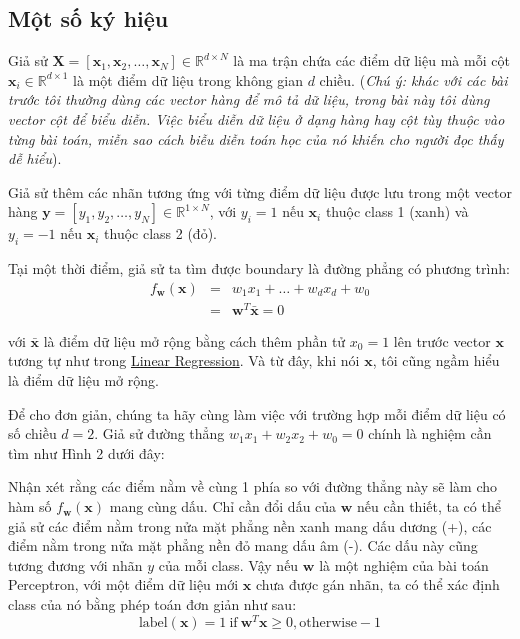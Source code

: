  
\subsection{Một số ký hiệu}
Giả sử $\mathbf{X} = [\mathbf{x}_1, \mathbf{x}_2, \dots, \mathbf{x}_N] \in \mathbb{R}^{d \times N}$ là ma trận chứa các điểm dữ liệu mà mỗi cột $\mathbf{x}_i \in \mathbb{R}^{d\times 1}$ là một điểm dữ liệu trong không gian $d$ chiều. (\textit{Chú ý: khác với các bài trước tôi thường dùng các vector hàng để mô tả dữ liệu, trong bài này tôi dùng vector cột để biểu diễn. Việc biểu diễn dữ liệu ở dạng hàng hay cột tùy thuộc vào từng bài toán, miễn sao cách biễu diễn toán học của nó khiến cho người đọc thấy dễ hiểu}). 
 
Giả sử thêm các nhãn tương ứng với từng điểm dữ liệu được lưu trong một vector hàng $\mathbf{y} = [y_1, y_2, \dots, y_N] \in \mathbb{R}^{1\times N}$, với $y_i = 1$ nếu $\mathbf{x}_i$ thuộc class 1 (xanh) và $y_i = -1$ nếu $\mathbf{x}_i$ thuộc class 2 (đỏ). 
 
Tại một thời điểm, giả sử ta tìm được boundary là đường phẳng có phương trình: 
\begin{eqnarray} 
f_{\mathbf{w}}(\mathbf{x}) &=& w_1x_1 + \dots + w_dx_d + w_0 \\\  
&=&\mathbf{w}^T\mathbf{\bar{x}} = 0 
\end{eqnarray} 
 
với $\mathbf{\bar{x}}$ là điểm dữ liệu mở rộng bằng cách thêm phần tử $x_0 = 1$ lên trước vector $\mathbf{x}$ tương tự như trong \href{http://machinelearningcoban.com/2016/12/28/linearregression/}{Linear Regression}. Và từ đây, khi nói $\mathbf{x}$, tôi cũng ngầm hiểu là điểm dữ liệu mở rộng. 
 
Để cho đơn giản, chúng ta hãy cùng làm việc với trường hợp mỗi điểm dữ liệu có số chiều $d = 2$. Giả sử đường thẳng $w_1 x_1 + w_2 x_2 + w_0 = 0$ chính là nghiệm cần tìm như Hình 2 dưới đây: 
 
 
Nhận xét rằng các điểm nằm về cùng 1 phía so với đường thẳng này sẽ làm cho hàm số $f_{\mathbf{w}}(\mathbf{x})$ mang cùng dấu. Chỉ cần đổi dấu của $\mathbf{w}$ nếu cần thiết, ta có thể giả sử các điểm nằm trong nửa mặt phẳng nền xanh mang dấu dương (+), các điểm nằm trong nửa mặt phẳng nền đỏ mang dấu âm (-). Các dấu này cũng tương đương với nhãn $y$ của mỗi class. Vậy nếu $\mathbf{w}$ là một nghiệm của bài toán Perceptron, với một điểm dữ liệu mới $\mathbf{x}$ chưa được gán nhãn, ta có thể xác định class của nó bằng phép toán đơn giản như sau: 
\begin{equation*} 
\text{label}(\mathbf{x}) = 1 ~\text{if}~ \mathbf{w}^T\mathbf{x} \geq 0, \text{otherwise} -1 
\end{equation*} 
 
